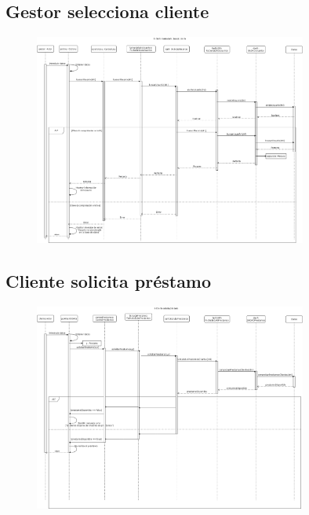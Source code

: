 \documentclass[12pt]{article}
\begin{document}
\subsection{Gestor selecciona cliente}
\begin{figure}[H]
    \centering
    \includegraphics[width=0.8\textwidth]{gestor_selecciona_cliente_consultar_5.png}
\end{figure}

\subsection{Cliente solicita préstamo}
\begin{figure}[H]
    \centering
    \includegraphics[width=0.8\textwidth]{ClienteSolicitaPrestamo2.png}
\end{figure}
\end{document}
